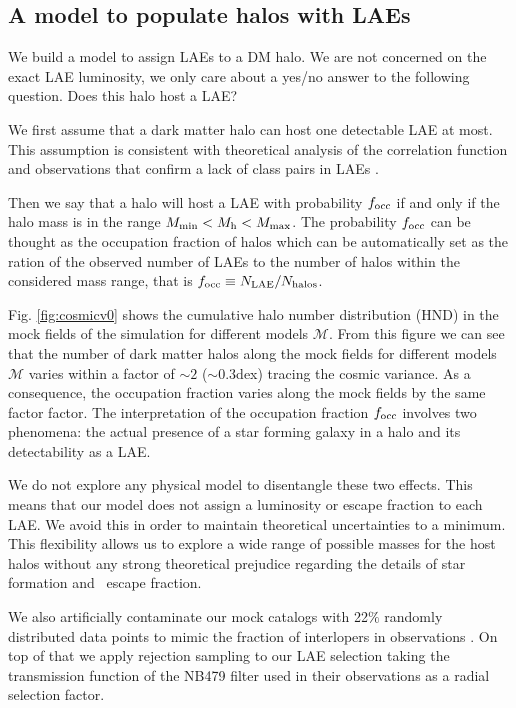 \documentclass{emulateapj}
\newcommand{\ly}{{\ifmmode{{\rm Ly}\alpha}\else{Ly$\alpha$}\fi}}
\begin{document}
\subsection{A model to populate halos with LAEs}
\label{subsec:mocks}

We build a model to assign LAEs to a DM halo. 
We are not concerned on the exact LAE luminosity, we only care about a yes/no answer to the following question. Does this halo host a LAE?

We first assume that a dark matter halo can host one detectable LAE at most.  
This assumption is consistent with theoretical analysis of the correlation function \citep{Jose2013b} and observations that confirm a lack of class pairs in LAEs \cite{Bond2009}. 

Then we say that a halo will host a LAE with probability $f_{\rm occ}$ if and only if the halo mass is in the range $M_{\rm min}< M_{\rm h} < M_{\rm max}$.
The probability $f_{\rm occ}$ can be thought as the occupation fraction of halos which can be automatically set as the ration of the observed number of LAEs to the number of halos within the considered mass range, that is $f_{\rm occ}\equiv N_{\rm LAE}/N_{\rm halos}$.

Fig. \ref{fig:cosmicv0}  shows the cumulative halo number distribution (HND) in the  mock fields of the simulation for different models $\mathcal{M}$. From this figure we can see that the number of dark matter halos along the mock fields for different models $\mathcal{M}$ varies within a factor of $\sim 2$ ($\sim 0.3$dex) tracing the cosmic variance. As a consequence, the occupation fraction varies along  the mock fields  by the same factor factor. The interpretation of the occupation fraction $f_{\rm occ}$ involves two phenomena: the actual presence of a star forming galaxy in a halo and its detectability as a LAE. 

We do not explore any physical model to disentangle these two effects. This means that our model does not assign a luminosity or escape fraction to each
LAE.
We avoid this in order to maintain theoretical uncertainties to a minimum. 
This flexibility allows us to explore a wide range of possible masses for
the host halos without any strong theoretical prejudice regarding the
details of star formation and \ly\  escape fraction.

We also artificially contaminate our mock catalogs with 22$\%$ randomly distributed data points to mimic the fraction of interlopers in observations \citet{Bielby16} .
On top of that we apply rejection sampling  to our LAE selection taking the transmission function of the NB479 filter used in their observations as a radial selection factor.
\end{document}
